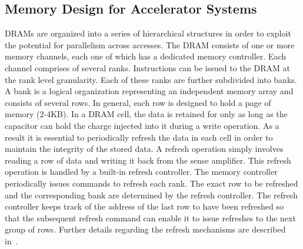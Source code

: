 \subsection{Memory Design for Accelerator Systems}


DRAMs are organized into a series of hierarchical structures in order to exploit the potential for parallelism across accesses. The DRAM consists of one or more memory channels, each one of which has a dedicated memory controller. Each channel comprises of several ranks. Instructions can be issued to the DRAM at the rank level granularity. Each of these ranks are further subdivided into banks. A bank is a logical organization representing an independent memory array and consists of several rows. In general, each row is designed to hold a page of memory (2-4KB).
In a DRAM cell, the data is retained for only as long as the capacitor can hold the charge injected into it during a write operation. 
As a result it is essential to periodically refresh the data in each cell in order to maintain the integrity of the stored data. A refresh operation simply involves reading a row of data and writing it back from the sense amplifier. 
This refresh operation is handled by a built-in refresh controller. The memory controller periodically issues commands to refresh each rank.
The exact row to be refreshed and the corresponding bank are determined by the refresh controller. 
The refresh controller keeps track of the address of the last row to have been refreshed so that the subsequent refresh command can enable it to issue refreshes to the next group of rows.
Further details regarding the refresh mechanisms are described in~\cite{jedec-sdram-standards}.
